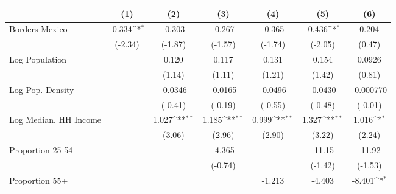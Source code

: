 {
\def\sym#1{\ifmmode^{#1}\else\(^{#1}\)\fi}
\begin{tabular}{l*{6}{c}}
\toprule
                    &\multicolumn{1}{c}{(1)}         &\multicolumn{1}{c}{(2)}         &\multicolumn{1}{c}{(3)}         &\multicolumn{1}{c}{(4)}         &\multicolumn{1}{c}{(5)}         &\multicolumn{1}{c}{(6)}         \\
\midrule
Borders Mexico      &      -0.334\sym{*}  &      -0.303         &      -0.267         &      -0.365         &      -0.436\sym{*}  &       0.204         \\
                    &     (-2.34)         &     (-1.87)         &     (-1.57)         &     (-1.74)         &     (-2.05)         &      (0.47)         \\
\addlinespace
Log Population      &                     &       0.120         &       0.117         &       0.131         &       0.154         &      0.0926         \\
                    &                     &      (1.14)         &      (1.11)         &      (1.21)         &      (1.42)         &      (0.81)         \\
\addlinespace
Log Pop. Density    &                     &     -0.0346         &     -0.0165         &     -0.0496         &     -0.0430         &   -0.000770         \\
                    &                     &     (-0.41)         &     (-0.19)         &     (-0.55)         &     (-0.48)         &     (-0.01)         \\
\addlinespace
Log Median. HH Income&                     &       1.027\sym{**} &       1.185\sym{**} &       0.999\sym{**} &       1.327\sym{**} &       1.016\sym{*}  \\
                    &                     &      (3.06)         &      (2.96)         &      (2.90)         &      (3.22)         &      (2.24)         \\
\addlinespace
Proportion 25-54    &                     &                     &      -4.365         &                     &      -11.15         &      -11.92         \\
                    &                     &                     &     (-0.74)         &                     &     (-1.42)         &     (-1.53)         \\
\addlinespace
Proportion 55+      &                     &                     &                     &      -1.213         &      -4.403         &      -8.401\sym{*}  \\

\end{tabular}}
